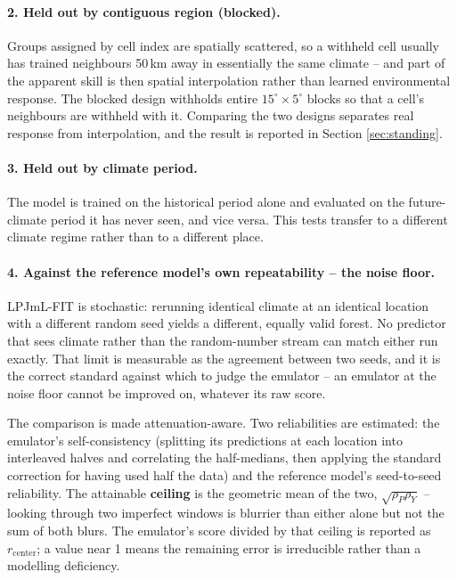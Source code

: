 \documentclass[11pt]{article}
\begin{document}
\paragraph{2. Held out by contiguous region (blocked).} Groups assigned by cell index are spatially scattered, so a withheld cell usually has trained neighbours 50\,km away in essentially the same climate -- and part of the apparent skill is then spatial interpolation rather than learned environmental response. The blocked design withholds entire $15^\circ \times 5^\circ$ blocks so that a cell's neighbours are withheld with it. Comparing the two designs separates real response from interpolation, and the result is reported in Section \ref{sec:standing}.

\paragraph{3. Held out by climate period.} The model is trained on the historical period alone and evaluated on the future-climate period it has never seen, and vice versa. This tests transfer to a different climate regime rather than to a different place.

\paragraph{4. Against the reference model's own repeatability -- the noise floor.}
\label{sec:floor}
LPJmL-FIT is stochastic: rerunning identical climate at an identical location with a different random seed yields a different, equally valid forest. No predictor that sees climate rather than the random-number stream can match either run exactly. That limit is measurable as the agreement between two seeds, and it is the correct standard against which to judge the emulator -- an emulator at the noise floor cannot be improved on, whatever its raw score.

The comparison is made attenuation-aware. Two reliabilities are estimated: the emulator's self-consistency (splitting its predictions at each location into interleaved halves and correlating the half-medians, then applying the standard correction for having used half the data) and the reference model's seed-to-seed reliability. The attainable \textbf{ceiling} is the geometric mean of the two, $\sqrt{\rho_P \rho_Y}$ -- looking through two imperfect windows is blurrier than either alone but not the sum of both blurs. The emulator's score divided by that ceiling is reported as $r_\mathrm{center}$; a value near 1 means the remaining error is irreducible rather than a modelling deficiency.
\end{document}
